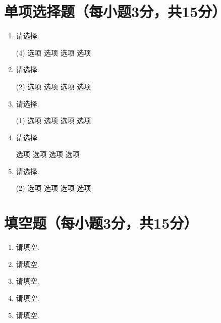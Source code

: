 \documentclass[oneside,AutoFakeBold=2.85]{cjluexam}
\begin{document}
\maketitle

\section{单项选择题（每小题3分，共15分）}

\begin{enumerate}[topsep=8pt,itemsep=4pt]
  \item
    请选择\Fill{4em}{}.
    \begin{tasks}(4)
      \task 选项
      \task 选项
      \task 选项
      \task 选项
    \end{tasks}
  \item
    请选择\Fill{4em}{}.
    \begin{tasks}(2)
      \task 选项
      \task 选项
      \task 选项
      \task 选项
    \end{tasks}
  \item
    请选择\Fill{4em}{}.
    \begin{tasks}(1)
      \task 选项
      \task 选项
      \task 选项
      \task 选项
    \end{tasks}
  \item
    请选择\Fill{4em}{}.
    \begin{tasks}
      \task 选项
      \task 选项
      \task 选项
      \task 选项
    \end{tasks}
  \item
    请选择\Fill{4em}{}.
    \begin{tasks}(2)
      \task 选项
      \task 选项
      \task 选项
      \task 选项
    \end{tasks}
\end{enumerate}

\clearpage

\section{填空题（每小题3分，共15分）}

\begin{enumerate}[topsep=8pt, itemsep=4pt]
  \item
    请填空\Fill{8em}{}.
  \item
    请填空\Fill{8em}{}.
  \item
    请填空\Fill{8em}{}.
  \item
    请填空\Fill{8em}{}.
  \item
    请填空\Fill{8em}{}.
\end{enumerate}
\end{document}
